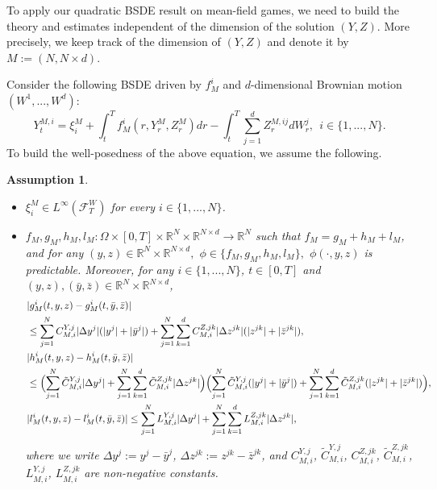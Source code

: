 \documentclass[10pt,a4paper]{article}
\newcommand{\R}{\mathbb{R}}
\newcommand{\MF}{{\mathcal{F}}}
\theoremstyle{plain}
\newtheorem{Assumption}[Theorem]{Assumption}
\theoremstyle{definition}
\numberwithin{equation}{section}
\begin{document}
To apply our quadratic BSDE result on mean-field games, we need to build the theory and estimates independent of the dimension of the solution $(Y,Z).$ More precisely, we keep track of the dimension of $(Y,Z)$ and denote it by $M:=(N,N\times d)$. 

Consider the following BSDE driven by $f^i_M$ and $d$-dimensional Brownian motion $(W^{1},...,W^{d}):$
\begin{equation}
\label{equ:3.genBSDE}
Y_{t}^{M,i} = \xi_{i}^{M} + \int_{t}^{T}f_{M}^{i}(r,Y_{r}^{M},Z_{r}^{M})dr - \int_{t}^{T}\sum_{j=1}^{d}Z_{r}^{M,ij}dW_{r}^{j}, \ \ i \in \{1,...,N\}.
\end{equation}
To build the well-posedness of the above equation, we assume the following.

\begin{Assumption}\label{assu:well-posedBSDE}

\begin{itemize} 
     


\item[\textnormal{(i)}] $\xi_{i}^{M} \in L^{\infty}(\MF^W_T)$ for every $i \in \{1,...,N\}$.



\item[\textnormal{(ii)}] $f_{M},g_{M},h_{M},l_{M}: \Omega \times [0,T] \times \mathbb{R}^{N} \times \mathbb{R}^{N \times d} \rightarrow \mathbb{R}^{N}$ such that  $f_{M} = g_{M} + h_{M} + l_{M}$, and for any $(y,z) \in \R^N \times \R^{N \times d},$ $\phi \in \{ f_{M},g_{M},h_{M},l_{M}\},$ $\phi(\cdot, y,z)$ is predictable. Moreover, for any $i \in \{1,...,N\}$, $t \in [0,T]$ and $(y,z),(\bar{y},\bar{z}) \in \mathbb{R}^{N} \times \mathbb{R}^{N \times d}$, 
\begin{align}\label{equ:3.estcomponent}
&|g_{M}^{i}(t,y,z) - g_{M}^{i}(t,\bar{y},\bar{z})|  \\
&\leq \sum_{j=1}^{N}C_{M,i}^{Y,j}|\Delta y^{j}|(|y^{j}|+|\bar{y}^{j}|) + \sum_{j=1}^{N}\sum_{k=1}^{d}C_{M,i}^{Z,jk}|\Delta z^{jk}|(|z^{jk}|+|\bar{z}^{jk}|), \nonumber \\ \label{equ:3.estcross} 
&|h_{M}^{i}(t,y,z) - h_{M}^{i}(t,\bar{y},\bar{z})|  \\ 
& \leq \Bigl(\sum_{j=1}^{N}\tilde{C}_{M,i}^{Y,j}|\Delta y^{j}| + \sum_{j=1}^{N}\sum_{k=1}^{d}\tilde{C}_{M,i}^{Z,jk}|\Delta z^{jk}|\Bigr)\Bigl(\sum_{j=1}^{N}\tilde{C}_{M,i}^{Y,j}(|y^{j}|+|\bar{y}^{j}|) + \sum_{j=1}^{N}\sum_{k=1}^{d}\tilde{C}_{M,i}^{Z,jk}(|z^{jk}|+|\bar{z}^{jk}|)\Bigr), \nonumber \\ \label{equ:3.estlinear}
&|l_{M}^{i}(t,y,z)-l_{M}^{i}(t,\bar{y},\bar{z})| \leq \sum_{j=1}^{N}L_{M,i}^{Y,j}|\Delta y^{j}| + \sum_{j=1}^{N}\sum_{k=1}^{d}L_{M,i}^{Z,jk}|\Delta z^{jk}|, 
\end{align}
where we write $\Delta y^{j} := y^{j}-\bar{y}^{j}$, $\Delta z^{jk} := z^{jk}-\bar{z}^{jk}$, and $C_{M,i}^{Y,j}$, $\tilde{C}_{M,i}^{Y,j}$, $C_{M,i}^{Z,jk}$, $\tilde{C}_{M,i}^{Z,jk}$, $L_{M,i}^{Y,j}$, $L_{M,i}^{Z,jk}$ are non-negative constants.


\end{itemize}
\end{Assumption}
\end{document}
